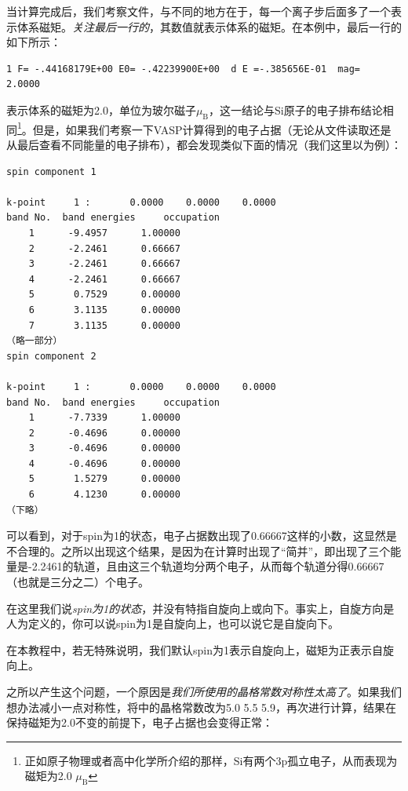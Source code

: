 当计算完成后，我们考察文件，与不同的地方在于，每一个离子步后面多了一个表示体系磁矩。\emph{关注最后一行的}，其数值就表示体系的磁矩。在本例中，最后一行的如下所示：

\begin{lstlisting}[caption=OSZICAR]
1 F= -.44168179E+00 E0= -.42239900E+00  d E =-.385656E-01  mag=     2.0000
\end{lstlisting}

表示体系的磁矩为2.0，单位为玻尔磁子$\mu_\text{B}$，这一结论与Si原子的电子排布结论相同\footnote{正如原子物理或者高中化学所介绍的那样，Si有两个3p孤立电子，从而表现为磁矩为2.0 $\mu_\text{B}$}。但是，如果我们考察一下VASP计算得到的电子占据（无论从文件读取还是从最后查看不同能量的电子排布），都会发现类似下面的情况（我们这里以为例）：

\begin{lstlisting}[caption=OUTCAR]
spin component 1

k-point     1 :       0.0000    0.0000    0.0000
band No.  band energies     occupation
    1      -9.4957      1.00000
    2      -2.2461      0.66667
    3      -2.2461      0.66667
    4      -2.2461      0.66667
    5       0.7529      0.00000
    6       3.1135      0.00000
    7       3.1135      0.00000
（略一部分）
spin component 2

k-point     1 :       0.0000    0.0000    0.0000
band No.  band energies     occupation
    1      -7.7339      1.00000
    2      -0.4696      0.00000
    3      -0.4696      0.00000
    4      -0.4696      0.00000
    5       1.5279      0.00000
    6       4.1230      0.00000
（下略）
\end{lstlisting}

可以看到，对于spin为1的状态，电子占据数出现了0.66667这样的小数，这显然是不合理的。之所以出现这个结果，是因为在计算时出现了“简并”，即出现了三个能量是-2.2461的轨道，且由这三个轨道均分两个电子，从而每个轨道分得0.66667（也就是三分之二）个电子。

\begin{attention}
    在这里我们说\emph{spin为1的状态}，并没有特指自旋向上或向下。事实上，自旋方向是人为定义的，你可以说spin为1是自旋向上，也可以说它是自旋向下。

    在本教程中，若无特殊说明，我们默认spin为1表示自旋向上，磁矩为正表示自旋向上。
\end{attention}

之所以产生这个问题，一个原因是\emph{我们所使用的晶格常数对称性太高了}。如果我们想办法减小一点对称性，将中的晶格常数改为5.0 5.5 5.9，再次进行计算，结果在保持磁矩为2.0不变的前提下，电子占据也会变得正常：


